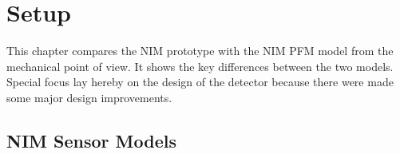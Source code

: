 \section{Setup}\label{sec:setup}
	

	This chapter compares the NIM prototype with the NIM PFM model from the mechanical point of view. It shows the key differences between the two models. Special focus lay hereby on the design of the detector because there were made some major design improvements.
	
	
	
	
	\subsection{NIM Sensor Models }\label{subsec:setupInst}
	
	
	
	

